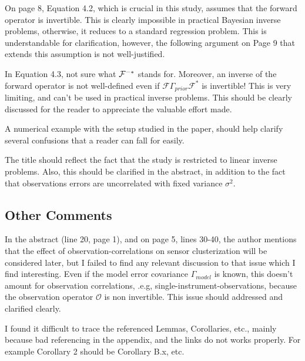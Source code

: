 \documentclass{amsart}
\begin{document}
On page 8, Equation 4.2, which is crucial in this study, assumes that
the forward operator is invertible. This is clearly impossible in
practical Bayesian inverse problems, otherwise, it reduces to a
standard regression problem. This is understandable for clarification,
however, the following argument on Page 9 that extends this assumption
is not well-justified. 


In Equation 4.3, not sure what $\mathcal{F}^{-*}$ stands for. Moreover, an
inverse of the forward operator is not well-defined even if
$\mathcal{F}\Gamma_{prior}\mathcal{F}^*$ is invertible! This is very
limiting, and can't be used in practical inverse problems. This should
be clearly discussed for the reader to appreciate the valuable effort
made. 


A numerical example with the setup studied in the paper, should help
clarify several confusions that a reader can fall for easily.


The title should reflect the fact that the study is restricted to
linear inverse problems. Also, this should be clarified in the
abstract, in addition to the fact that observations errors are
uncorrelated with fixed variance $\sigma^2$. 



\subsection{Other Comments}

In the abstract (line 20, page 1), and on page 5, lines 30-40, the
author mentions that the effect of observation-correlations on sensor
clusterization will be considered later, but I failed to find any
relevant discussion to that issue which I find interesting. Even if
the model error covariance $\Gamma_{model}$ is known, this doesn't
amount for observation correlations, .e.g,
single-instrument-observations, because the observation operator
$\mathcal{O}$ is non invertible. This issue should addressed and
clarified clearly.

I found it difficult to trace the referenced Lemmas, Corollaries,
etc., mainly because bad referencing in the appendix, and the links do
not works properly.  For example Corollary 2 should be Corollary B.x,
etc. 
\end{document}

